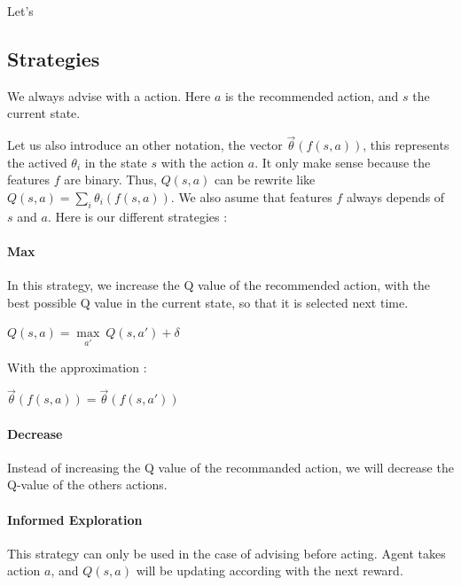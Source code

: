 \documentclass[a4paper,12pt]{article}
\begin{document}
      Let's 
      
      \subsection{Strategies}
      
      We always advise with a action. Here $a$ is the recommended action, and $s$ the current state.
     
     Let us also introduce an other notation, the vector $\vec\theta(f(s,a))$, this represents the actived $\theta_i$ in 
      the state $s$ with the action $a$. It only make sense because the features $f$ are binary.
      Thus, $Q(s,a)$ can be rewrite like $Q(s,a) = \sum\limits_{i} \theta_{i}(f(s,a))$.
      We also asume that features $f$ always depends of $s$ and $a$.
      \newline
      \newline
      Here is our different strategies :
      
      \paragraph{Max} In this strategy, we increase the Q value of the recommended action, 
      with the best possible Q value in the current state, so that it is selected next time. \newline
      \begin{center}
       $Q(s,a) = \underset{a'}{\operatorname{max}}\ Q(s,a') + \delta$
      \end{center}
      With the approximation :
      \begin{center}
	$\vec\theta(f(s,a)) = \vec\theta(f(s,a'))$
	\end{center}
       
       \paragraph{Decrease} Instead of increasing the Q value of the recommanded action, we will decrease
       the Q-value of the others actions.
       
       \paragraph{Informed Exploration}
       This strategy can only be used in the case of advising before acting. Agent takes action $a$,
       and $Q(s,a)$ will be updating according with the next reward.
       
\end{document}
